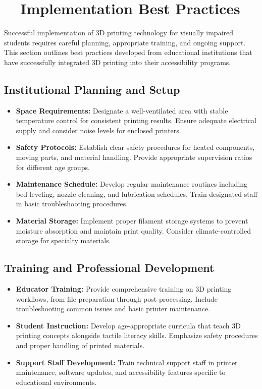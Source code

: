 \section{~~Implementation Best Practices}\label{ch5:sec:implementation}

Successful implementation of 3D printing technology for visually impaired students requires careful planning, appropriate training, and ongoing support. This section outlines best practices developed from educational institutions that have successfully integrated 3D printing into their accessibility programs.

\subsection{Institutional Planning and Setup}
\begin{itemize}
	\item \textbf{Space Requirements:} Designate a well-ventilated area with stable temperature control for consistent printing results. Ensure adequate electrical supply and consider noise levels for enclosed printers.
	\item \textbf{Safety Protocols:} Establish clear safety procedures for heated components, moving parts, and material handling. Provide appropriate supervision ratios for different age groups.
	\item \textbf{Maintenance Schedule:} Develop regular maintenance routines including bed leveling, nozzle cleaning, and lubrication schedules. Train designated staff in basic troubleshooting procedures.
	\item \textbf{Material Storage:} Implement proper filament storage systems to prevent moisture absorption and maintain print quality. Consider climate-controlled storage for specialty materials.
\end{itemize}

\subsection{Training and Professional Development}
\begin{itemize}
	\item \textbf{Educator Training:} Provide comprehensive training on 3D printing workflows, from file preparation through post-processing. Include troubleshooting common issues and basic printer maintenance.
	\item \textbf{Student Instruction:} Develop age-appropriate curricula that teach 3D printing concepts alongside tactile literacy skills. Emphasize safety procedures and proper handling of printed materials.
	\item \textbf{Support Staff Development:} Train technical support staff in printer maintenance, software updates, and accessibility features specific to educational environments.
\end{itemize}

